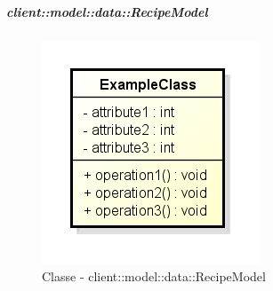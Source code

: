 
		\subparagraph{client::model::data::RecipeModel} %
		\label{subp:client_model_data_recipe}
			\begin{figure}[htbp]
				\centering
				\centerline{\includegraphics[scale=0.7]{./images/client/classes/example_class.png}}
				\caption{Classe - client::model::data::RecipeModel}
			\end{figure}
